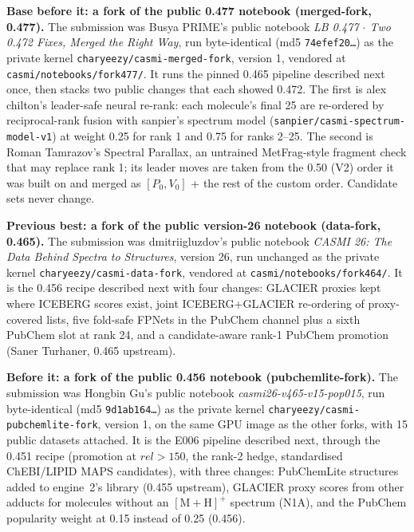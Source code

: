 \documentclass[11pt]{article}
\begin{document}
\textbf{Base before it: a fork of the public 0.477 notebook (merged-fork, 0.477).} The submission was
Busya PRIME's public notebook \emph{LB 0.477 $\cdot$ Two 0.472 Fixes, Merged the Right Way}, run byte-identical
(md5 \texttt{74efef20\ldots}) as the private kernel \nolinkurl{charyeezy/casmi-merged-fork}, version 1,
vendored at \nolinkurl{casmi/notebooks/fork477/}. It runs the pinned 0.465 pipeline described next once,
then stacks two public changes that each showed 0.472. The first is alex chilton's leader-safe neural
re-rank: each molecule's final 25 are re-ordered by reciprocal-rank fusion with sanpier's spectrum model
(\nolinkurl{sanpier/casmi-spectrum-model-v1}) at weight 0.25 for rank 1 and 0.75 for ranks 2--25. The
second is Roman Tamrazov's Spectral Parallax, an untrained MetFrag-style fragment check that may replace
rank 1; its leader moves are taken from the 0.50 (V2) order it was built on and merged as $[P_0, V_0]$ +
the rest of the custom order. Candidate sets never change.

\textbf{Previous best: a fork of the public version-26 notebook (data-fork, 0.465).} The submission was
dmitriigluzdov's public notebook \emph{CASMI 26: The Data Behind Spectra to Structures}, version 26, run
unchanged as the private kernel \nolinkurl{charyeezy/casmi-data-fork}, vendored at
\nolinkurl{casmi/notebooks/fork464/}. It is the 0.456 recipe described next with four changes: GLACIER
proxies kept where ICEBERG scores exist, joint ICEBERG+GLACIER re-ordering of proxy-covered lists, five
fold-safe FPNets in the PubChem channel plus a sixth PubChem slot at rank 24, and a candidate-aware rank-1
PubChem promotion (Saner Turhaner, 0.465 upstream).

\textbf{Before it: a fork of the public 0.456 notebook (pubchemlite-fork).} The submission was
Hongbin Gu's public notebook \emph{casmi26-v465-v15-pop015}, run byte-identical (md5
\texttt{9d1ab164\ldots}) as the private kernel \texttt{charyeezy/casmi-pubchemlite-fork}, version 1,
on the same GPU image as the other forks, with 15 public datasets attached. It is the E006 pipeline
described next, through the 0.451 recipe (promotion at $\mathit{rel} > 150$, the rank-2 hedge,
standardised ChEBI/LIPID MAPS candidates), with three changes: PubChemLite structures added to
engine~2's library (0.455 upstream), GLACIER proxy scores from other adducts for molecules without an
$[\mathrm{M{+}H}]^+$ spectrum (N1A), and the PubChem popularity weight at 0.15 instead of 0.25 (0.456).
\end{document}
